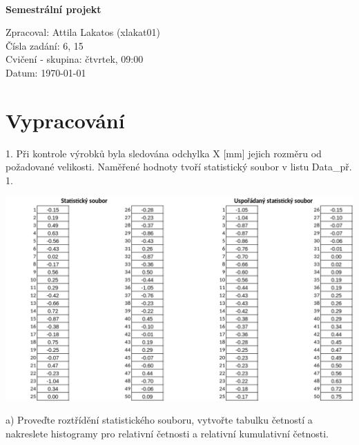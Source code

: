 \documentclass[11pt,a4paper]{article}
\begin{document}
\begin{titlepage}
\begin{center}
        \hfill\\[10mm]

        \LARGE{
            \textbf{
                Semestrální projekt
            }
        }
        \vfill

    \end{center}

        \Large{
            \noindent Zpracoval: Attila Lakatos (xlakat01)\hfill \\
             Čísla zadání: 6, 15 \\
             Cvičení - skupina: čtvrtek, 09:00 \\
             Datum: \today
        }

\end{titlepage}


\newpage



\section{Vypracování}

1. Při kontrole výrobků byla sledována odchylka X [mm] jejich rozměru od požadované velikosti. Naměřené hodnoty tvoří statistický soubor v listu Data\_př. 1.

\vspace{0,5cm}\includegraphics[width=\textwidth]{img/task1.pdf}\vspace{0,5cm}
\noindent\makebox[\linewidth]{\rule{\textwidth}{0.4pt}}

a) Proveďte roztřídění statistického souboru, vytvořte tabulku četností a nakreslete histogramy pro relativní četnosti a relativní kumulativní četnosti.
\vspace{0,5cm}
\end{document}

